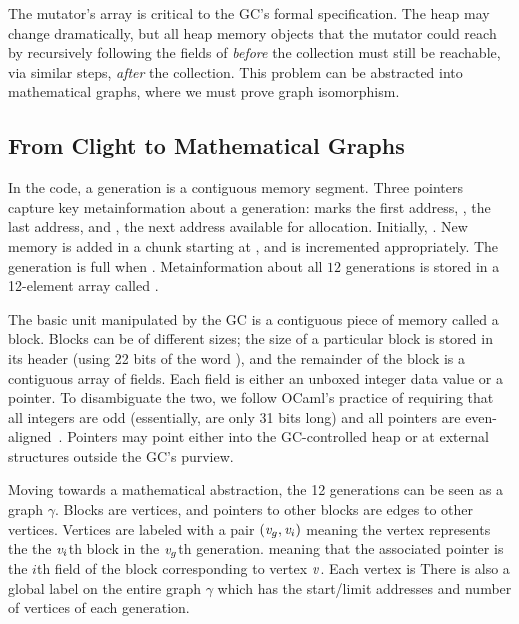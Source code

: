 The mutator's  array is critical to the GC's formal specification.
The heap may change dramatically, but all heap memory objects 
that the mutator could reach by recursively
following the fields of  \emph{before} the collection 
must still be reachable, via similar steps, \emph{after} the collection.  This problem can be abstracted 
into mathematical graphs, where we must prove graph isomorphism.

\subsection{From Clight to Mathematical Graphs}
\label{sec:movetomathgraph}
In the code, a generation is a contiguous memory segment. 
Three pointers capture key metainformation about a generation:
 marks the first address, ,
the last address, and , the next address available for 
allocation.  
Initially, . 
New memory is added in a chunk starting 
at , and  is
incremented appropriately. 
The generation is full when .
Metainformation about all $12$ generations is stored in 
a 12-element array called .
	
The basic unit manipulated by the GC is a
contiguous piece of memory called a block. Blocks can be of different sizes;
the size of a particular block is stored in its
header (using 22 bits of the word 
), and the remainder of the block is a contiguous array of fields.
Each field is either an unboxed integer data value or a pointer. 
To disambiguate the two,
we follow OCaml's practice of requiring that all integers are odd 
(essentially, are only 31 bits long) and all pointers are even-aligned~\cite{realworldocaml}. Pointers may point either into the GC-controlled heap or at external structures outside the GC's purview.

Moving towards a mathematical abstraction, the 12 generations can be seen
as a graph $\gamma$. Blocks are
vertices, and pointers to other blocks are edges to other
vertices. Vertices are labeled with
a pair $(\mathit{v}_g, \mathit{v}_i)$ meaning the vertex represents the 
the $\mathit{v}_i$th block in the $\mathit{v}_g$th generation. 
 meaning that 
the associated pointer is the $i$th field of the block
corresponding to vertex $\mathit{v}$. 
Each vertex is  There is also a global label on the entire graph $\gamma$ which has the
start/limit addresses and number of vertices of each generation. 

